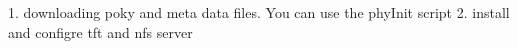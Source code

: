 


1. downloading poky and meta data files. You can use the phyInit script
2. install and configre tft and nfs server
